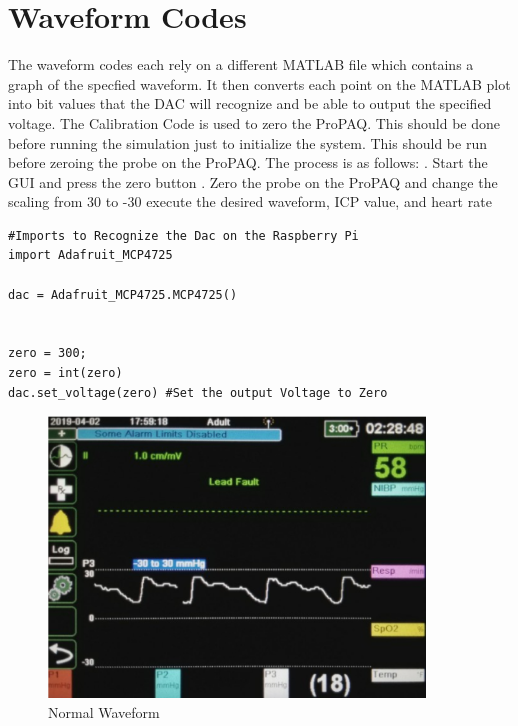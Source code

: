 \documentclass[12pt]{report}
\begin{document}
\section*{Waveform Codes}
The waveform codes each rely on a different MATLAB file which contains a graph of the specfied waveform. It then converts each point on the MATLAB plot into bit values that the DAC will recognize and be able to output the specified voltage. \newline\newline The Calibration Code is used to zero the ProPAQ. This should be done before running the simulation just to initialize the system. This should be run before zeroing the probe on the ProPAQ. The process is as follows: . Start the GUI and press the zero button . Zero the probe on the ProPAQ and change the scaling from 30 to -30 \newline execute the desired waveform, ICP value, and heart rate 
\lstset{language=Python}
\lstset{frame=lines}
\lstset{basicstyle=\footnotesize}
\begin{lstlisting}
#Imports to Recognize the Dac on the Raspberry Pi
import Adafruit_MCP4725

dac = Adafruit_MCP4725.MCP4725()


zero = 300;
zero = int(zero)
dac.set_voltage(zero) #Set the output Voltage to Zero
\end{lstlisting}


\begin{figure}[h!]
\includegraphics[width = 10cm]{Normal.png}
\centering
\caption{Normal Waveform}
\end{figure}
\end{document}
